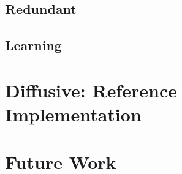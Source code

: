 \documentclass[11pt]{amsart}
\begin{document}
\subsection{Redundant}

\subsection{Learning}

%
%
\section{Diffusive: Reference Implementation}

%
%
\section{Future Work}




\end{document}
